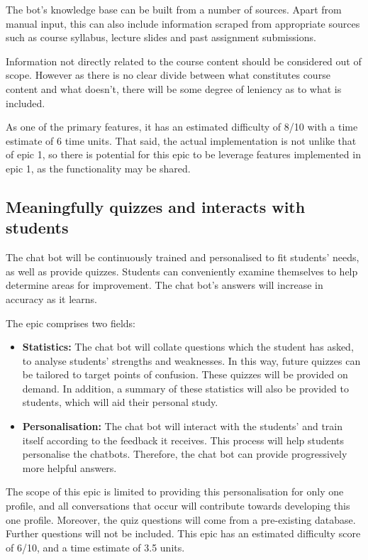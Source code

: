 \documentclass{article}
\begin{document}
The bot's knowledge base can be built from a number of sources. Apart from manual input, this can also include information scraped from appropriate sources such as course syllabus, lecture slides and past assignment submissions.

Information not directly related to the course content should be considered out of scope. However as there is no clear divide between what constitutes course content and what doesn't, there will be some degree of leniency as to what is included.

As one of the primary features, it has an estimated difficulty of 8/10 with a time estimate of 6 time units. That said, the actual implementation is not unlike that of epic 1, so there is potential for this epic to be leverage features implemented in  epic 1, as the functionality may be shared.

\subsection{Meaningfully quizzes and interacts with students}
The chat bot will be continuously trained and personalised to fit students' needs, as well as provide quizzes. Students can conveniently examine themselves to help determine areas for improvement. The chat bot's answers will increase in accuracy as it learns.

The epic comprises two fields:
\begin{itemize}
  \item \textbf{Statistics:} The chat bot will collate questions which the student has asked, to analyse students' strengths and weaknesses. In this way, future quizzes can be tailored to target points of confusion. These quizzes will be provided on demand. In addition, a summary of these statistics will also be provided to students, which will aid their personal study.
  \item \textbf{Personalisation:} The chat bot will interact with the students' and train itself according to the feedback it receives. This process will help students personalise the chatbots. Therefore, the chat bot can provide progressively more helpful answers.
\end{itemize}

The scope of this epic is limited to providing this personalisation for only one profile, and all conversations that occur will contribute towards developing this one profile. Moreover, the quiz questions will come from a pre-existing database. Further questions will not be included. This epic has an estimated difficulty score of 6/10, and a time estimate of 3.5 units.
\end{document}
